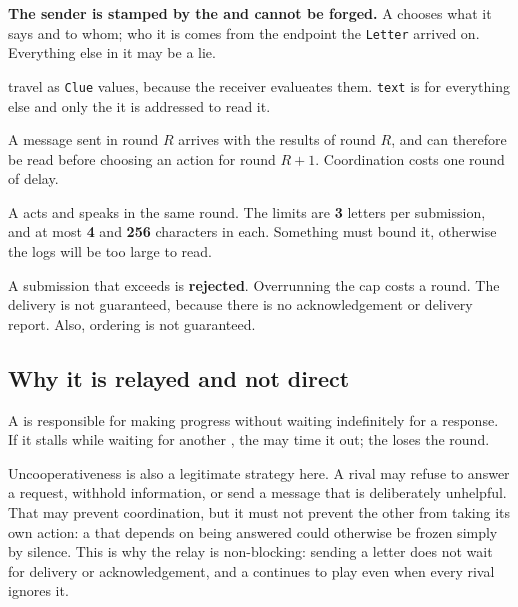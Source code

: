 \documentclass{article}
\begin{document}
\textbf{The sender is stamped by the \admiralty{} and cannot be forged.} A \ship{} chooses what it
says and to whom; who it is comes from the endpoint the \texttt{Letter} arrived on. Everything else in
it may be a lie.

\clues{} travel as \texttt{Clue} values, because the receiver evalueates them. \texttt{text} is for everything else and only the \ship{} it is addressed to read it.

A message sent in round $R$ arrives with the results of round $R$, and can therefore be read before
choosing an action for round $R+1$. Coordination costs one round of delay.

A \ship{} acts and speaks in the same round. The limits are \textbf{3}
letters per submission, and at most \textbf{4} \clues{} and \textbf{256} characters in each.
Something must bound it, otherwise the logs will be too large to read.

A submission that exceeds is \textbf{rejected}.
Overrunning the cap costs a round.
The \admiralty{} delivery is not guaranteed, because there is no acknowledgement or delivery report. Also, ordering is not guaranteed.

\subsection{Why it is relayed and not direct}

A \ship{} is responsible for making progress without waiting indefinitely for a response. If it
stalls while waiting for another \ship{}, the \admiralty{} may time it out; the \ship{} loses the
round.

Uncooperativeness is also a legitimate strategy here. A rival may refuse to answer a request,
withhold information, or send a message that is deliberately unhelpful. That may prevent
coordination, but it must not prevent the other \ship{} from taking its own action: a \ship{} that
depends on being answered could otherwise be frozen simply by silence. This is why the relay is
non-blocking: sending a letter does not wait for delivery or acknowledgement, and a \ship{} continues
to play even when every rival ignores it.
\end{document}
